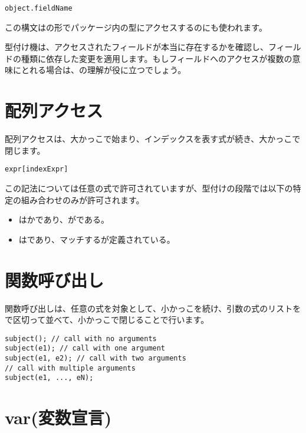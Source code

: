 \begin{lstlisting}
object.fieldName
\end{lstlisting}

この構文はの形でパッケージ内の型にアクセスするのにも使われます。

型付け機は、アクセスされたフィールドが本当に存在するかを確認し、フィールドの種類に依存した変更を適用します。もしフィールドへのアクセスが複数の意味にとれる場合は、の理解が役に立つでしょう。

\section{配列アクセス}
\label{expression-array-access}

配列アクセスは、大かっこ\expr{[}で始まり、インデックスを表す式が続き、大かっこ\expr{]}で閉じます。

\begin{lstlisting}
expr[indexExpr]
\end{lstlisting}

この記法については任意の式で許可されていますが、型付けの段階では以下の特定の組み合わせのみが許可されます。

\begin{itemize}
	\item {}はかであり、がである。
	\item {}はであり、マッチするが定義されている。
\end{itemize}

\section{関数呼び出し}
\label{expression-function-call}

関数呼び出しは、任意の式を対象として、小かっこ\expr{(}を続け、引数の式のリストを\expr{,}で区切って並べて、小かっこ\expr{)}で閉じることで行います。

\begin{lstlisting}
subject(); // call with no arguments
subject(e1); // call with one argument
subject(e1, e2); // call with two arguments
// call with multiple arguments
subject(e1, ..., eN);
\end{lstlisting}

\section{var(変数宣言)}
\label{expression-var}

